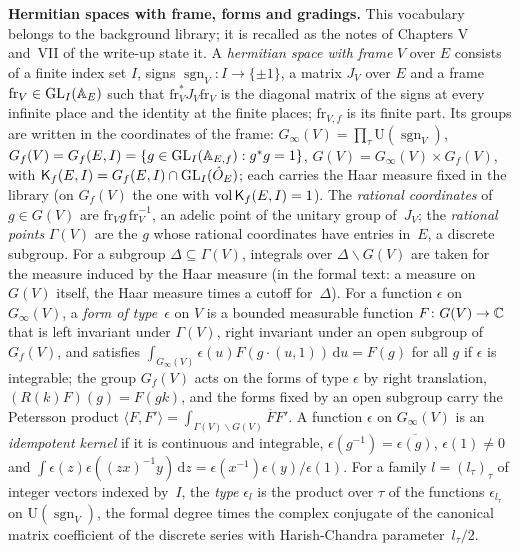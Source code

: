 \documentclass[11pt,a4paper]{article}
\newcommand{\subhead}[1]{\par\addvspace{9pt plus 2pt}\Needspace{4\baselineskip}\noindent\textbf{#1}\enspace\ignorespaces}
\theoremstyle{plainx}
\theoremstyle{uprightx}
\newcommand{\dd}{\mathrm{d}}
\begin{document}
\subhead{Hermitian spaces with frame, forms and gradings.}\label{s:spaces}
This vocabulary belongs to the background library; it is recalled as the notes of Chapters V and~VII of the write-up
state it. A \emph{hermitian space with frame} $V$ over $E$ consists of a finite index set $I$, signs
$\operatorname{sgn}_V\colon I\to\{\pm1\}$, a matrix $J_V$ over $E$ and a frame $\mathrm{fr}_V\in\mathrm{GL}_I(\mathbb{A}_{E})$ such that
$\mathrm{fr}_V^{*}J_V\mathrm{fr}_V$ is the diagonal matrix of the signs at every infinite place and the identity at the
finite places; $\mathrm{fr}_{V,f}$ is its finite part. Its groups are written in the coordinates of the frame:
$G_\infty(V)=\prod_\tau\mathrm{U}(\operatorname{sgn}_V)$, $G_f(V)=G_{f}(E,I)=\{g\in\mathrm{GL}_I(\mathbb{A}_{E,f}):g^{*}g=1\}$,
$G(V)=G_\infty(V)\times G_f(V)$, with $\mathsf{K}_{f}(E,I)=G_{f}(E,I)\cap\mathrm{GL}_I(\hat{O}_E)$; each carries the Haar measure fixed in the
library (on $G_f(V)$ the one with $\operatorname{vol}\mathsf{K}_{f}(E,I)=1$). The \emph{rational coordinates} of $g\in G(V)$ are
$\mathrm{fr}_Vg\,\mathrm{fr}_V^{-1}$, an adelic point of the unitary group of~$J_V$; the \emph{rational points}
$\Gamma(V)$ are the $g$ whose rational coordinates have entries in~$E$, a discrete subgroup. For a subgroup
$\Delta\subseteq\Gamma(V)$, integrals over $\Delta\backslash G(V)$ are taken for the measure induced by the Haar
measure (in the formal text: a measure on $G(V)$ itself, the Haar measure times a cutoff for~$\Delta$). For a
function $\epsilon$ on $G_\infty(V)$, a \emph{form of type~$\epsilon$} on $V$ is a bounded measurable function
$F\colon G(V)\to\mathbb{C}$ that is left invariant under $\Gamma(V)$, right invariant under an open subgroup of~$G_f(V)$,
and satisfies $\int_{G_\infty(V)}\epsilon(u)F(g\cdot(u,1))\,\dd u=F(g)$ for all $g$ if $\epsilon$ is integrable; the
group $G_f(V)$ acts on the forms of type $\epsilon$ by right translation, $(R(k)F)(g)=F(gk)$, and the forms fixed by
an open subgroup carry the Petersson product $\langle F,F'\rangle=\int_{\Gamma(V)\backslash G(V)}\overline{F}F'$.
A function $\epsilon$ on $G_\infty(V)$ is an \emph{idempotent kernel} if it is continuous and integrable,
$\epsilon(g^{-1})=\overline{\epsilon(g)}$, $\epsilon(1)\ne0$ and
$\int\epsilon(z)\epsilon((zx)^{-1}y)\,\dd z=\epsilon(x^{-1})\epsilon(y)/\epsilon(1)$. For a family
$l=(l_\tau)_\tau$ of integer vectors indexed by~$I$, the \emph{type} $\epsilon_l$ is the product over $\tau$ of the
functions $\epsilon_{l_\tau}$ on $\mathrm{U}(\operatorname{sgn}_V)$, the formal degree times the complex conjugate of
the canonical matrix coefficient of the discrete series with Harish-Chandra parameter~$l_\tau/2$.
\end{document}
